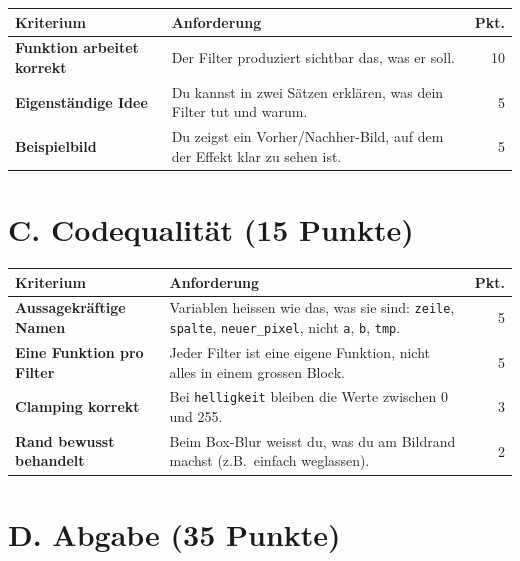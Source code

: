 \begin{center}
\begin{tabularx}{\textwidth}{>{\bfseries}p{4cm} X r}
\toprule
\tableheadercolor
Kriterium & Anforderung & Pkt. \\
\midrule
Funktion arbeitet korrekt
  & Der Filter produziert sichtbar das, was er soll.
  & 10 \\
\midrule
Eigenst\"andige Idee
  & Du kannst in zwei S\"atzen erkl\"aren, was dein Filter tut und warum.
  & 5 \\
\midrule
Beispielbild
  & Du zeigst ein Vorher/Nachher-Bild, auf dem der Effekt klar zu sehen ist.
  & 5 \\
\bottomrule
\end{tabularx}
\end{center}

\section{C. Codequalit\"at (15 Punkte)}

\begin{center}
\begin{tabularx}{\textwidth}{>{\bfseries}p{4cm} X r}
\toprule
\tableheadercolor
Kriterium & Anforderung & Pkt. \\
\midrule
Aussagekr\"aftige Namen
  & Variablen heissen wie das, was sie sind:
    \texttt{zeile}, \texttt{spalte}, \texttt{neuer\_pixel}, nicht
    \texttt{a}, \texttt{b}, \texttt{tmp}.
  & 5 \\
\midrule
Eine Funktion pro Filter
  & Jeder Filter ist eine eigene Funktion, nicht alles in einem grossen
    Block.
  & 5 \\
\midrule
Clamping korrekt
  & Bei \texttt{helligkeit} bleiben die Werte zwischen 0 und 255.
  & 3 \\
\midrule
Rand bewusst behandelt
  & Beim Box-Blur weisst du, was du am Bildrand machst (z.B.\ einfach
    weglassen).
  & 2 \\
\bottomrule
\end{tabularx}
\end{center}

\section{D. Abgabe (35 Punkte)}

